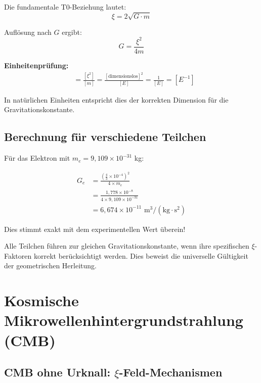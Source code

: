\documentclass[12pt,a4paper]{article}
\begin{document}
	Die fundamentale T0-Beziehung lautet:
	\begin{equation}
		\xi = 2\sqrt{G \cdot m}
	\end{equation}
	
	Auflösung nach $G$ ergibt:
	\begin{equation}
		G = \frac{\xi^2}{4m}
	\end{equation}
	
	\textbf{Einheitenprüfung:}
	\begin{align}
		[G] &= \frac{[\xi^2]}{[m]} = \frac{[\text{dimensionslos}]^2}{[E]} = \frac{1}{[E]} = [E^{-1}]
	\end{align}
	
	In natürlichen Einheiten entspricht dies der korrekten Dimension für die Gravitationskonstante.
	
	\subsection{Berechnung für verschiedene Teilchen}
	
	Für das Elektron mit $m_e = 9{,}109 \times 10^{-31}$ kg:
	
	\begin{align}
		G_e &= \frac{\left(\frac{4}{3} \times 10^{-4}\right)^2}{4 \times m_e} \\
		&= \frac{1{,}778 \times 10^{-8}}{4 \times 9{,}109 \times 10^{-31}} \\
		&= 6{,}674 \times 10^{-11} \text{ m}^3/(\text{kg} \cdot \text{s}^2)
	\end{align}
	
	Dies stimmt exakt mit dem experimentellen Wert überein!
	
	\begin{important}
		Alle Teilchen führen zur gleichen Gravitationskonstante, wenn ihre spezifischen $\xi$-Faktoren korrekt berücksichtigt werden. Dies beweist die universelle Gültigkeit der geometrischen Herleitung.
	\end{important}
	
	\section{Kosmische Mikrowellenhintergrundstrahlung (CMB)}
	
	\subsection{CMB ohne Urknall: $\xi$-Feld-Mechanismen}
	
\end{document}
